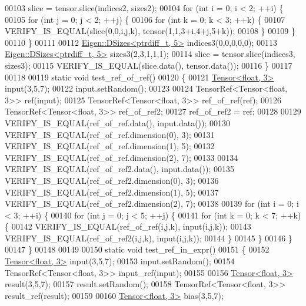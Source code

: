 \begin{DoxyCode}
00103   slice = tensor.slice(indices2, sizes2);
00104   \textcolor{keywordflow}{for} (\textcolor{keywordtype}{int} i = 0; i < 2; ++i) \{
00105     \textcolor{keywordflow}{for} (\textcolor{keywordtype}{int} j = 0; j < 2; ++j) \{
00106       \textcolor{keywordflow}{for} (\textcolor{keywordtype}{int} k = 0; k < 3; ++k) \{
00107         VERIFY\_IS\_EQUAL(slice(0,0,i,j,k), tensor(1,1,3+i,4+j,5+k));
00108       \}
00109     \}
00110   \}
00111 
00112   \hyperlink{struct_eigen_1_1_d_sizes}{Eigen::DSizes<ptrdiff\_t, 5>} indices3(0,0,0,0,0);
00113   \hyperlink{struct_eigen_1_1_d_sizes}{Eigen::DSizes<ptrdiff\_t, 5>} sizes3(2,3,1,1,1);
00114   slice = tensor.slice(indices3, sizes3);
00115   VERIFY\_IS\_EQUAL(slice.data(), tensor.data());
00116 \}
00117 
00118 
00119 \textcolor{keyword}{static} \textcolor{keywordtype}{void} test\_ref\_of\_ref()
00120 \{
00121   \hyperlink{class_eigen_1_1_tensor}{Tensor<float, 3>} input(3,5,7);
00122   input.setRandom();
00123 
00124   TensorRef<Tensor<float, 3>> ref(input);
00125   TensorRef<Tensor<float, 3>> ref\_of\_ref(ref);
00126   TensorRef<Tensor<float, 3>> ref\_of\_ref2;
00127   ref\_of\_ref2 = ref;
00128 
00129   VERIFY\_IS\_EQUAL(ref\_of\_ref.data(), input.data());
00130   VERIFY\_IS\_EQUAL(ref\_of\_ref.dimension(0), 3);
00131   VERIFY\_IS\_EQUAL(ref\_of\_ref.dimension(1), 5);
00132   VERIFY\_IS\_EQUAL(ref\_of\_ref.dimension(2), 7);
00133 
00134   VERIFY\_IS\_EQUAL(ref\_of\_ref2.data(), input.data());
00135   VERIFY\_IS\_EQUAL(ref\_of\_ref2.dimension(0), 3);
00136   VERIFY\_IS\_EQUAL(ref\_of\_ref2.dimension(1), 5);
00137   VERIFY\_IS\_EQUAL(ref\_of\_ref2.dimension(2), 7);
00138 
00139   \textcolor{keywordflow}{for} (\textcolor{keywordtype}{int} i = 0; i < 3; ++i) \{
00140     \textcolor{keywordflow}{for} (\textcolor{keywordtype}{int} j = 0; j < 5; ++j) \{
00141       \textcolor{keywordflow}{for} (\textcolor{keywordtype}{int} k = 0; k < 7; ++k) \{
00142         VERIFY\_IS\_EQUAL(ref\_of\_ref(i,j,k), input(i,j,k));
00143         VERIFY\_IS\_EQUAL(ref\_of\_ref2(i,j,k), input(i,j,k));
00144      \}
00145     \}
00146   \}
00147 \}
00148 
00149 
00150 \textcolor{keyword}{static} \textcolor{keywordtype}{void} test\_ref\_in\_expr()
00151 \{
00152   \hyperlink{class_eigen_1_1_tensor}{Tensor<float, 3>} input(3,5,7);
00153   input.setRandom();
00154   TensorRef<Tensor<float, 3>> input\_ref(input);
00155 
00156   \hyperlink{class_eigen_1_1_tensor}{Tensor<float, 3>} result(3,5,7);
00157   result.setRandom();
00158   TensorRef<Tensor<float, 3>> result\_ref(result);
00159 
00160   \hyperlink{class_eigen_1_1_tensor}{Tensor<float, 3>} bias(3,5,7);

\end{DoxyCode}
